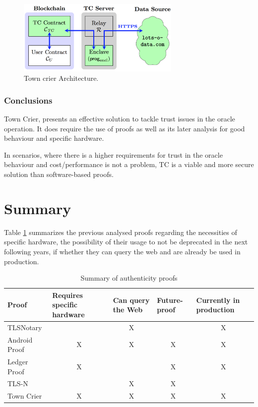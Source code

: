 \begin{figure}[H]
    \begin{center}
      \leavevmode
      \includegraphics[width=0.7\textwidth]{figures/town-crier.png}
      \caption{Town crier Architecture.}
      \label{fig:/figures/town-crier2}
    \end{center}
\end{figure}



\subsubsection{Conclusions}
Town Crier, presents an effective solution to tackle trust issues in the oracle operation. It does require the use of proofs as well as its later analysis for good behaviour and specific hardware.

In scenarios, where there is a higher requirements for trust in the oracle behaviour and cost/performance is not a problem, TC is a viable and more secure solution than software-based proofs.


\section{Summary}

Table \ref{tab:summary-proofs} summarizes the previous analysed proofs regarding the necessities of specific hardware, the possibility of their usage to not be deprecated in the next following years, if whether they can query the web and are already be used in production.

\begin{table}[]
    \centering
    \begin{tabular}{@{}lcccc@{}}
    \toprule
    Proof & \multicolumn{1}{l}{Requires specific hardware} & \multicolumn{1}{l}{Can query the Web} & \multicolumn{1}{l}{Future-proof} & \multicolumn{1}{l}{Currently in production} \\ \midrule
    TLSNotary &  & X &  & X \\
    Android Proof & X & X & X & X \\
    Ledger Proof & X &  & X & X \\
    TLS-N &  & X & X &  \\
    Town Crier & X & X & X & X \\ \bottomrule
    \end{tabular}
    \caption{Summary of authenticity proofs}
    \label{tab:summary-proofs}
    \end{table}



